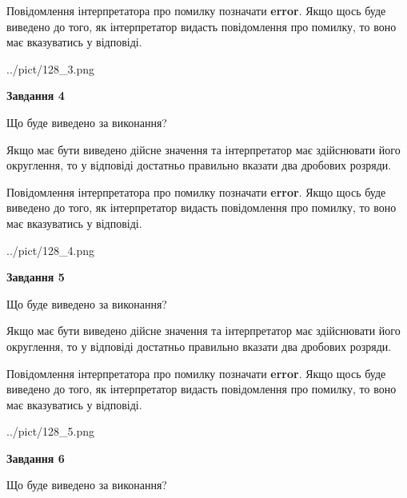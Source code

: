 \documentclass[12pt, ukrainian]{article}
\begin{document}
{\begin {Large}
Повідомлення інтерпретатора про помилку позначати \textbf{error}.
Якщо щось буде виведено до того, як інтерпретатор видасть повідомлення про помилку, 
то воно має вказуватись у відповіді. \par

\begin{center}
	{../pict/128_3.png}
\end{center}
\newpage

{\begin {center}\textbf{Завдання 4}\end {center}}\par
Що буде виведено за виконання? \par

Якщо має бути виведено дійсне значення та інтерпретатор має здійснювати його округлення, 
то у відповіді достатньо правильно вказати два дробових розряди.

Повідомлення інтерпретатора про помилку позначати \textbf{error}.
Якщо щось буде виведено до того, як інтерпретатор видасть повідомлення про помилку, 
то воно має вказуватись у відповіді. \par

\begin{center}
	{../pict/128_4.png}
\end{center}
\newpage

{\begin {center}\textbf{Завдання 5}\end {center}}\par
Що буде виведено за виконання? \par

Якщо має бути виведено дійсне значення та інтерпретатор має здійснювати його округлення, 
то у відповіді достатньо правильно вказати два дробових розряди.

Повідомлення інтерпретатора про помилку позначати \textbf{error}.
Якщо щось буде виведено до того, як інтерпретатор видасть повідомлення про помилку, 
то воно має вказуватись у відповіді. \par

\begin{center}
	{../pict/128_5.png}
\end{center}
\newpage

{\begin {center}\textbf{Завдання 6}\end {center}}\par
Що буде виведено за виконання? \par


\end{Large}}
\end{document}
